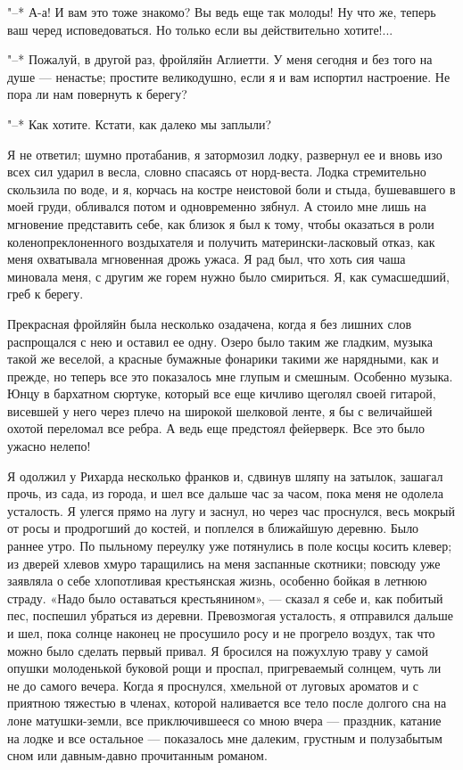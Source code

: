 "--* А-а! И вам  это тоже знакомо? Вы ведь еще так  молоды! Ну что же,
теперь  ваш  черед исповедоваться.  Но  только  если вы  действительно
хотите!...

"--* Пожалуй,  в другой раз, фройляйн  Аглиетти. У меня сегодня  и без
того на душе --- ненастье; простите великодушно, если я и вам испортил
настроение. Не пора ли нам повернуть к берегу?

"--* Как хотите. Кстати, как далеко мы заплыли?

Я не  ответил; шумно  протабанив, я затормозил  лодку, развернул  ее и
вновь  изо всех  сил ударил  в весла,  словно спасаясь  от норд-веста.
Лодка стремительно скользила по воде, и я, корчась на костре неистовой
боли и стыда, бушевавшего в моей груди, обливался потом и одновременно
зябнул. А стоило мне лишь на  мгновение представить себе, как близок я
был к тому,  чтобы оказаться в роли  коленопреклоненного воздыхателя и
получить  матерински-ласковый отказ,  как  меня охватывала  мгновенная
дрожь ужаса. Я рад  был, что хоть сия чаша миновала  меня, с другим же
горем нужно было смириться. Я, как сумасшедший, греб к берегу.

Прекрасная фройляйн была несколько озадачена,  когда я без лишних слов
распрощался с  нею и  оставил ее  одну. Озеро  было таким  же гладким,
музыка  такой  же  веселой,  а красные  бумажные  фонарики  такими  же
нарядными, как  и прежде, но  теперь все  это показалось мне  глупым и
смешным. Особенно  музыка. Юнцу в  бархатном сюртуке, который  все еще
кичливо щеголял своей гитарой, висевшей  у него через плечо на широкой
шелковой ленте, я  бы с величайшей охотой переломал все  ребра. А ведь
еще предстоял фейерверк. Все это было ужасно нелепо!

Я одолжил  у Рихарда  несколько франков и,  сдвинув шляпу  на затылок,
зашагал прочь, из сада, из города, и шел все дальше час за часом, пока
меня не одолела  усталость. Я улегся прямо на лугу  и заснул, но через
час проснулся, весь мокрый от росы  и продрогший до костей, и поплелся
в  ближайшую  деревню. Было  раннее  утро.  По пыльному  переулку  уже
потянулись  в  поле  косцы  косить  клевер;  из  дверей  хлевов  хмуро
таращились на  меня заспанные  скотники; повсюду  уже заявляла  о себе
хлопотливая крестьянская жизнь, особенно бойкая в летнюю страду. «Надо
было оставаться крестьянином»,  --- сказал я себе и,  как побитый пес,
поспешил  убраться из  деревни.  Превозмогая  усталость, я  отправился
дальше и  шел, пока  солнце наконец  не просушило  росу и  не прогрело
воздух,  так что  можно  было  сделать первый  привал.  Я бросился  на
пожухлую  траву у  самой опушки  молоденькой буковой  рощи и  проспал,
пригреваемый солнцем, чуть ли не  до самого вечера. Когда я проснулся,
хмельной от луговых  ароматов и с приятною тяжестью  в членах, которой
наливается  все тело  после  долгого сна  на  лоне матушки-земли,  все
приключившееся  со мною  вчера ---  праздник, катание  на лодке  и все
остальное --- показалось мне далеким,  грустным и полузабытым сном или
давным-давно прочитанным романом.

